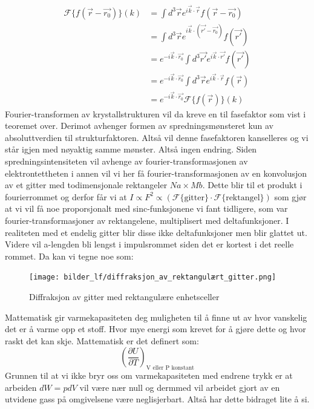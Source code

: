 \documentclass{article}
\begin{document}
\begin{align}
    \mathcal{F}\{f(\vec{r}-\vec{r_0})\}(k) &= \int d^3 \vec{r} e^{i \vec{k}\cdot\vec{r}} f(\vec{r}-\vec{r_0})\\
        &= \int d^3 \vec{r} e^{i \vec{k}\cdot (\vec{r'}-\vec{r_0})} f(\vec{r'})\\
    &= e^{-i \vec{k}\cdot\vec{r_0}}\int d^3 \vec{r'} e^{i \vec{k}\cdot \vec{r'}} f(\vec{r'})\\
    &= e^{-i \vec{k}\cdot\vec{r_0}}\int d^3 \vec{r} e^{i \vec{k}\cdot \vec{r}} f(\vec{r})\\
    &= e^{-i \vec{k}\cdot\vec{r_0}} \mathcal{F}\{f(\vec{r})\}(k)
\end{align}
Fourier-transformen av krystallstrukturen vil da kreve en til fasefaktor som vist i teoremet over. Derimot avhenger formen av spredningsmønsteret kun av absoluttverdien til strukturfaktoren. Altså vil denne fasefaktoren kanselleres og vi står igjen med nøyaktig samme mønster. Altså ingen endring.
Siden spredningsintensiteten vil avhenge av fourier-transformasjonen av elektrontettheten i annen vil vi her få fourier-transformasjonen av en konvolusjon av et gitter med todimensjonale rektangeler $Na \times Mb$. Dette blir til et produkt i fourierrommet og derfor får vi at $I \propto F^2 \propto(\mathcal{F}\{\text{gitter}\} \cdot \mathcal{F}\{\text{rektangel}\})$ som gjør at vi vil få noe proporsjonalt med  sinc-funksjonene vi fant tidligere, som var fourier-transformasjoner av rektangelene, multiplisert med deltafunksjoner. I realiteten med et endelig gitter blir disse ikke deltafunksjoner men blir glattet ut. Videre vil a-lengden bli lengst i impulsrommet siden det er kortest i det reelle rommet. Da kan vi tegne noe som:
\begin{figure}[H]
    \centering
    \texttt{[image: bilder\_lf/diffraksjon\_av\_rektangulært\_gitter.png]}
    \caption{Diffraksjon av gitter med rektangulære enhetsceller}
    \label{fig:diffraksjon_av_rektangulært_gitter}
\end{figure}
\nyside
{}
Mattematisk gir varmekapasiteten deg muligheten til å finne ut av hvor vanskelig det er å varme opp et stoff. Hvor mye energi som krevet for å gjøre dette og hvor raskt det kan skje. Mattematisk er det definert som:
\begin{equation}
    \left(\frac{\partial U}{\partial T}\right)_{\text{V eller P konstant}}
\end{equation}
Grunnen til at vi ikke bryr oss om varmekapasiteten med endrene trykk er at arbeiden $dW = pdV$ vil være nær null og dermmed vil arbeidet gjort av en utvidene gass på omgivelsene være neglisjerbart. Altså har dette bidraget lite å si.
\end{document}
